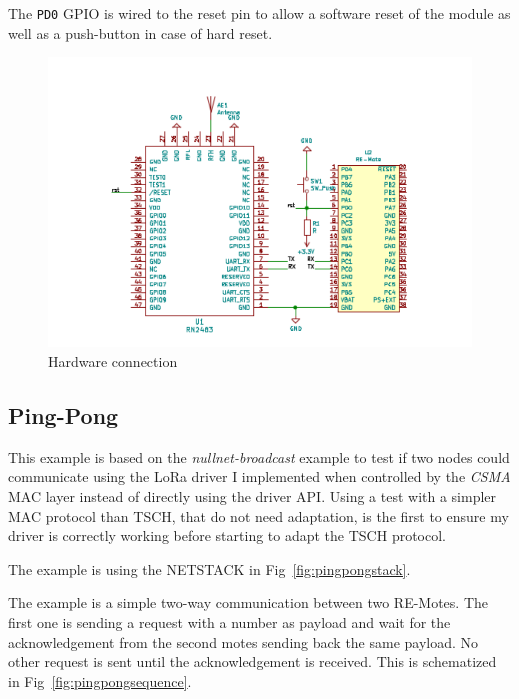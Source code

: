 The \lstinline{PD0} GPIO is wired to the reset pin to allow
a software reset of the module as well as a push-button in case of hard reset.

\begin{figure}[H]
  \centering
  \includegraphics[scale=0.70]{thesis.tex/chapters/driver/fig/conn_diag.pdf}
  \caption{Hardware connection\label{fig:schemaconn}}
\end{figure}

\subsection{Ping-Pong\label{section:pingpong}}

This example is based on the \emph{nullnet-broadcast} example to test if two
nodes could communicate using the LoRa driver I implemented when controlled by
the \emph{CSMA} MAC layer instead of directly using the driver API\@.
Using a test with a simpler MAC protocol than TSCH, that do not need adaptation,
is the first to ensure my driver is correctly working before starting to adapt
the TSCH protocol.

The example is using the NETSTACK in Fig~\ref{fig:pingpongstack}.



The example is a simple two-way communication between two RE-Motes.
The first one is sending a request with a number as
payload and wait for the acknowledgement from the second motes sending back
the same payload.
No other request is sent until the acknowledgement is received.
This is schematized in Fig~\ref{fig:pingpongsequence}.

